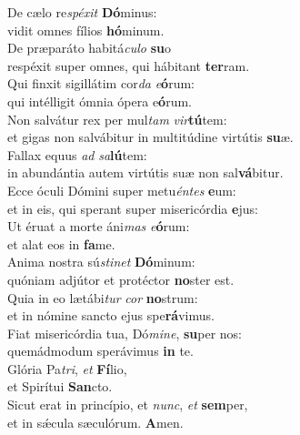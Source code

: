 \evenverse De cælo re\textit{spé}\textit{xit} \textbf{Dó}minus:~\*\\
\evenverse vidit omnes fílios \textbf{hó}minum.\\
\oddverse De præparáto habitá\textit{cu}\textit{lo} \textbf{su}o~\*\\
\oddverse respéxit super omnes, qui hábitant \textbf{ter}ram.\\
\evenverse Qui finxit sigillátim cor\textit{da} \textit{e}\textbf{ó}rum:~\*\\
\evenverse qui intélligit ómnia ópera e\textbf{ó}rum.\\
\oddverse Non salvátur rex per mul\textit{tam} \textit{vir}\textbf{tú}tem:~\*\\
\oddverse et gigas non salvábitur in multitúdine virtútis \textbf{su}æ.\\
\evenverse Fallax equus \textit{ad} \textit{sa}\textbf{lú}tem:~\*\\
\evenverse in abundántia autem virtútis suæ non sal\textbf{vá}bitur.\\
\oddverse Ecce óculi Dómini super metu\textit{én}\textit{tes} \textbf{e}um:~\*\\
\oddverse et in eis, qui sperant super misericórdia \textbf{e}jus:\\
\evenverse Ut éruat a morte áni\textit{mas} \textit{e}\textbf{ó}rum:~\*\\
\evenverse et alat eos in \textbf{fa}me.\\
\oddverse Anima nostra sú\textit{sti}\textit{net} \textbf{Dó}minum:~\*\\
\oddverse quóniam adjútor et protéctor \textbf{no}ster est.\\
\evenverse Quia in eo lætábi\textit{tur} \textit{cor} \textbf{no}strum:~\*\\
\evenverse et in nómine sancto ejus spe\textbf{rá}vimus.\\
\oddverse Fiat misericórdia tua, Dó\textit{mi}\textit{ne}, \textbf{su}per nos:~\*\\
\oddverse quemádmodum sperávimus \textbf{in} te.\\
\evenverse Glória Pa\textit{tri}, \textit{et} \textbf{Fí}lio,~\*\\
\evenverse et Spirítui \textbf{San}cto.\\
\oddverse Sicut erat in princípio, et \textit{nunc}, \textit{et} \textbf{sem}per,~\*\\
\oddverse et in sǽcula sæculórum. \textbf{A}men.\\
